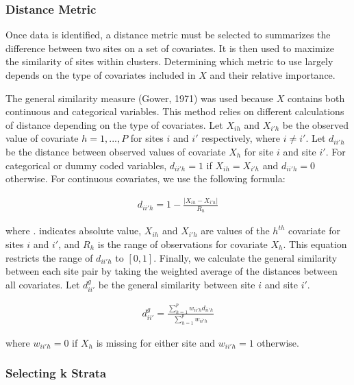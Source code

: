 \documentclass[man,floatsintext]{apa6}
\theoremstyle{definition}
\theoremstyle{definition}
\theoremstyle{definition}
\theoremstyle{remark}
\begin{document}
\hypertarget{distance-metric}{%
\subsubsection{Distance Metric}\label{distance-metric}}

Once data is identified, a distance metric must be selected to
summarizes the difference between two sites on a set of covariates. It
is then used to maximize the similarity of sites within clusters.
Determining which metric to use largely depends on the type of
covariates included in \(X\) and their relative importance.

The general similarity measure (Gower, 1971) was used because \(X\)
contains both continuous and categorical variables. This method relies
on different calculations of distance depending on the type of
covariates. Let \(X_{ih}\) and \(X_{i'h}\) be the observed value of
covariate \(h = {1, ..., P}\) for sites \(i\) and \(i'\) respectively,
where \(i \ne i'\). Let \(d_{ii'h}\) be the distance between observed
values of covariate \(X_{h}\) for site \(i\) and site \(i'\). For
categorical or dummy coded variables, \(d_{ii'h} = 1\) if
\(X_{ih} = X_{i'h}\) and \(d_{ii'h} = 0\) otherwise. For continuous
covariates, we use the following formula:

\begin{align}
  d_{ii'h} = 1 - \frac{|X_{ih} - X_{i'h}|}{R_h}
\end{align}

where \textbar{}.\textbar{} indicates absolute value, \(X_{ih}\) and
\(X_{i'h}\) are values of the \(h^{th}\) covariate for sites \(i\) and
\(i'\), and \(R_h\) is the range of observations for covariate \(X_h\).
This equation restricts the range of \(d_{ii'h}\) to \([0,1]\). Finally,
we calculate the general similarity between each site pair by taking the
weighted average of the distances between all covariates. Let
\(d^{g}_{ii'}\) be the general similarity between site \(i\) and site
\(i'\).

\begin{align}
  d^{g}_{ii'} = \frac{\sum^p_{h = 1}w_{ii'h}d_{ii'h}}{\sum^p_{h = 1}w_{ii'h}}
\end{align}

where \(w_{ii'h} = 0\) if \(X_h\) is missing for either site and
\(w_{ii'h} = 1\) otherwise.

\hypertarget{selecting-k-strata}{%
\subsubsection{Selecting k Strata}\label{selecting-k-strata}}
\end{document}
